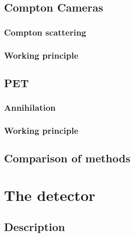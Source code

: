 \subsection{Compton Cameras}

\subsubsection{Compton scattering}

\subsubsection{Working principle}

\subsection{PET}

\subsubsection{Annihilation}

\subsubsection{Working principle}

\subsection{Comparison of methods}

\section{The detector}

\subsection{Description}

